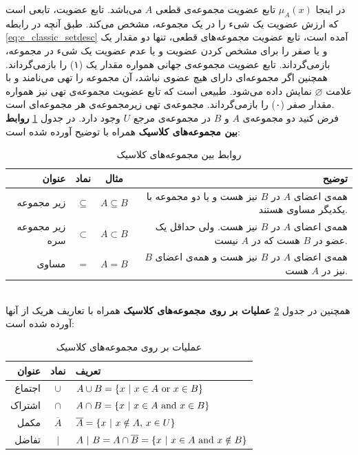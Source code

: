 در اینجا
$\mu_{A}(x)$
 تابع عضویت مجموعه‌ی قطعی $A$ می‌باشد. تابع عضویت، تابعی است که ارزش عضویت یک شیء را در یک مجموعه، مشخص می‌کند. طبق آنچه در رابطه
 \ref{eq:e_classic_setdesc}
 آمده است، تابع عضویت مجموعه‌های قطعی، تنها دو مقدار یک و یا صفر را برای مشخص کردن عضویت و یا عدم عضویت یک شیء در مجموعه، بازمی‌گرداند. تابع عضویت مجموعه‌ی جهانی همواره مقدار یک (۱) را بازمی‌گرداند. همچنین اگر مجموعه‌ای دارای هیچ عضوی نباشد، آن مجموعه‌ را تهی
 می‌نامند و با علامت $\varnothing$ نمایش داده می‌شود. طبیعی است که  تابع عضویت مجموعه‌ی تهی نیز همواره مقدار صفر (۰) را بازمی‌گرداند. مجموعه‌ی تهی زیرمجموعه‌ی هر مجموعه‌ای است.
 \cite{Lee2005}
 \\
فرض کنید دو مجموعه‌ی $ A $ و $ B  $ در مجموعه‌ی مرجع $ U $ وجود دارد.  در جدول   
\ref{table:t_classic_rel}
\textbf{روابط بین مجموعه‌های کلاسیک} 
 همراه با توضیح آورده شده است:
\begin{table}[!htbp]
\begin{center}
	{\footnotesize
 \begin{tabular}{r c c r} \hline
عنوان & نماد &  مثال & توضیح  
\\\hline 
زیر مجموعه  &
$\subseteq$ &
$A \subseteq B$ &
همه‌ی اعضای $A$ در $B$ نیز هست و یا دو مجموعه با یکدیگر مساوی هستند.
\\
زیر مجموعه سره &
$\subset$ &
 $A \subset B$ &
همه‌ی اعضای $A$ در $B$ نیز هست. ولی حداقل یک عضو در $B$ هست که در $A$ نیست.
\\
مساوی &
$=$ &
$A = B$ &
همه‌ی اعضای $A$ در $B$ نیز هست و همه‌ی اعضای $B$ نیز در $A$ هست.
\\\hline
 \end{tabular}
 \caption{روابط بین مجموعه‌های کلاسیک}
 \label{table:t_classic_rel}
}
\end{center}
\end{table}\\
همچنین در جدول
\ref{table:t_classic_op}
\textbf{عملیات بر روی مجموعه‌های کلاسیک} 
همراه با تعاریف هریک از آنها آورده شده‌ است:
\begin{table}[!htbp]
	{\normalsize
	\begin{center}
		\begin{tabular}{r c l} \hline
			عنوان & نماد & تعریف  
			\\\hline 
			اجتماع   &
			$\cup$ &
			$A \cup B = \{x\ |\ x \in A\ {\rm or}\ x \in B \}$ 
			\\
			اشتراک   &
			$\cap$ &
			$A \cap B = \{x\ |\ x \in A\ {\rm and}\ x \in B \}$ 
			\\	
			مکمل &
			$\overline{A}$ &
			$\overline{A} = \{x\ |\ x \notin A{\rm ,}\ x \in U \}$ 
			\\
			تفاضل &
			$|$ &
			$A \ |\ B = A\cap \overline{B} = \{x\ |\ x \in A\ {\rm and}\ x \notin B \}$ 
		   \\\hline 
		\end{tabular}
		\caption{عملیات بر روی مجموعه‌های کلاسیک}
		\label{table:t_classic_op}
\end{center}
	}
\end{table} \\
